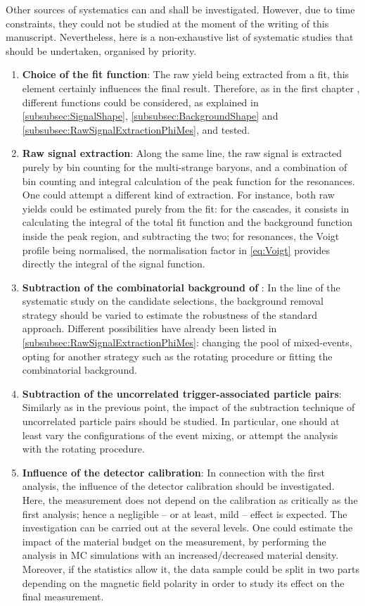 Other sources of systematics can and shall be investigated. However, due to time constraints, they could not be studied at the moment of the writing of this manuscript. Nevertheless, here is a non-exhaustive list of systematic studies that should be undertaken, organised by priority.

\begin{enumerate}
\item \textbf{Choice of the fit function}: The raw yield being extracted from a fit, this element certainly influences the final result. Therefore, as in the first chapter , different functions could be considered, as explained in \Sec\ref{subsubsec:SignalShape}, \ref{subsubsec:BackgroundShape} and \ref{subsubsec:RawSignalExtractionPhiMes}, and tested.
\item \textbf{Raw signal extraction}: Along the same line, the raw signal is extracted purely by bin counting for the multi-strange baryons, and a combination of bin counting and integral calculation of the peak function for the resonances. One could attempt a different kind of extraction. For instance, both raw yields could be estimated purely from the fit: for the cascades, it consists in calculating the integral of the total fit function and the background function inside the peak region, and subtracting the two; for resonances, the Voigt profile being normalised, the normalisation factor in \eq\ref{eq:Voigt} provides directly the integral of the signal function.
\item \textbf{Subtraction of the combinatorial background of \rmPhiMes}: In the line of the systematic study on the candidate selections, the background removal strategy should be varied to estimate the robustness of the standard approach. Different possibilities have already been listed in \Sec\ref{subsubsec:RawSignalExtractionPhiMes}: changing the pool of mixed-events, opting for another strategy such as the rotating procedure or fitting the combinatorial background.
\item \textbf{Subtraction of the uncorrelated trigger-associated particle pairs}: Similarly as in the previous point, the impact of the subtraction technique of uncorrelated particle pairs should be studied. In particular, one should at least vary the configurations of the event mixing, or attempt the analysis with the rotating procedure.
\item \textbf{Influence of the detector calibration}: In connection with the first analysis, the influence of the detector calibration should be investigated. Here, the measurement does not depend on the calibration as critically as the first analysis; hence a negligible -- or at least, mild -- effect is expected. The investigation can be carried out at the several levels. One could estimate the impact of the material budget on the measurement, by performing the analysis in MC simulations with an increased/decreased material density. Moreover, if the statistics allow it, the data sample could be split in two parts depending on the magnetic field polarity in order to study its effect on the final measurement.
\end{enumerate}


